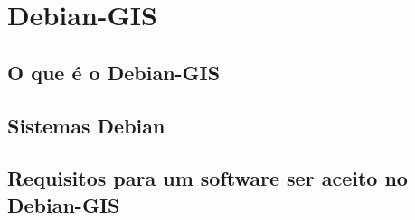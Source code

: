 \chapter{Debian-GIS}
\section{O que é o Debian-GIS}
\section{Sistemas Debian}
\section{Requisitos para um software ser aceito no Debian-GIS}
